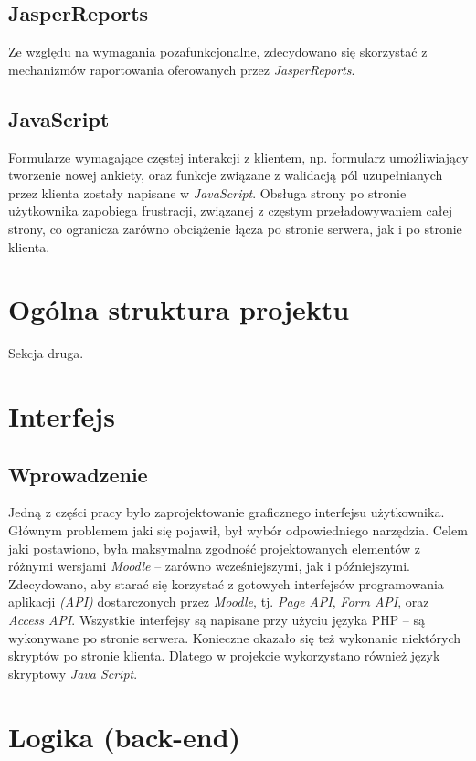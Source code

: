 \subsection{JasperReports}
Ze względu na wymagania pozafunkcjonalne, zdecydowano się skorzystać z mechanizmów raportowania oferowanych przez \emph{JasperReports}.

\subsection{JavaScript}
Formularze wymagające częstej interakcji z klientem, np. formularz umożliwiający tworzenie nowej ankiety, oraz funkcje związane z walidacją pól uzupełnianych przez klienta zostały napisane w \emph{JavaScript}. Obsługa strony po stronie użytkownika zapobiega frustracji, związanej z częstym przeładowywaniem całej strony, co ogranicza zarówno obciążenie łącza po stronie serwera, jak i po stronie klienta.

\section{Ogólna struktura projektu}
\label{Chapter63}

{\color{red}Sekcja druga.}

\section{Interfejs}
\label{Chapter64}

\subsection{Wprowadzenie}
Jedną z części pracy było zaprojektowanie graficznego interfejsu użytkownika. Głównym problemem jaki się pojawił, był wybór odpowiedniego narzędzia. Celem jaki postawiono, była maksymalna zgodność projektowanych elementów z różnymi wersjami \emph{Moodle} -- zarówno wcześniejszymi, jak i późniejszymi. Zdecydowano, aby starać się korzystać z gotowych interfejsów programowania aplikacji \emph{(API)} dostarczonych przez \emph{Moodle}, tj. \emph{Page API}, \emph{Form API}, oraz \emph{Access API}. Wszystkie interfejsy są napisane przy użyciu języka PHP -- są wykonywane po stronie serwera. Konieczne okazało się też wykonanie niektórych skryptów po stronie klienta. Dlatego w projekcie wykorzystano również język skryptowy \emph{Java Script}.

\section{Logika (back-end)}
\label{Chapter65}

